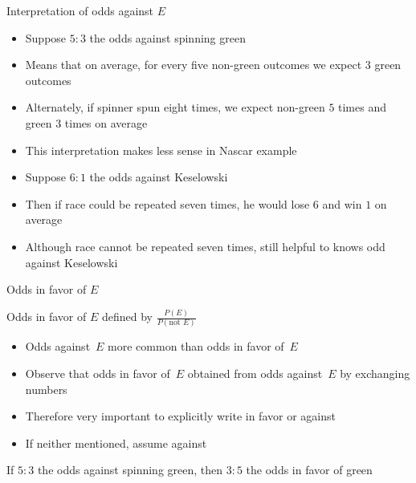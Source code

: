 \documentclass[handout]{beamer}
\theoremstyle{definition}
\begin{document}
\begin{frame}{Interpretation of odds against $E$}
\begin{itemize}
\item Suppose $5:3$ the odds against spinning green
\item Means that on average, for every five non-green outcomes
we expect $3$ green outcomes
\item Alternately, if spinner spun eight times, we expect
non-green $5$ times and green $3$ times on average
\item This interpretation makes less sense in Nascar example
\item Suppose $6:1$ the odds against Keselowski
\item Then if race could be repeated seven times, he would
lose $6$ and win $1$ on average
\item Although race \alert{cannot} be repeated seven times,
still helpful to knows odd against Keselowski
\end{itemize}
\end{frame}

\begin{frame}{Odds in favor of $E$}
\begin{definition}
\alert{Odds in favor of $E$} defined by
$\frac{P\left(E\right)}{P\left(\text{not $E$}\right)}$
\end{definition}
\begin{itemize}
\item Odds against~$E$ more common than \alert{odds in favor of~$E$}
\item Observe that odds in favor of~$E$ obtained
from odds against~$E$ by exchanging numbers
\item Therefore very important to explicitly write
\alert{in favor} or \alert{against}
\item If neither mentioned, assume \alert{against}
\end{itemize}
\begin{example} If $5:3$ the odds against spinning green,
then $3:5$ the odds in favor of green
\end{example}
\end{frame}
\end{document}
